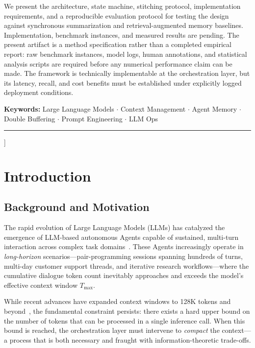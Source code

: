 \documentclass[10pt,twocolumn]{article}
\newcommand{\Tmax}{T_{\max}}
\begin{document}
\begin{center}
{    We present the architecture, state machine, stitching protocol, implementation
    requirements, and a reproducible evaluation protocol for testing the design against
    synchronous summarization and retrieval-augmented memory baselines. Implementation,
    benchmark instances, and measured results are pending. The present
    artifact is a method specification rather than a completed empirical report: raw
    benchmark instances, model logs, human annotations, and statistical analysis scripts
    are required before any numerical performance claim can be made. The framework is
    technically implementable at the orchestration layer, but its latency, recall, and
    cost benefits must be established under explicitly logged deployment conditions.
  }

  \vspace{0.6em}
  {\small\textbf{Keywords:} Large Language Models $\cdot$ Context Management $\cdot$ Agent Memory $\cdot$ Double Buffering $\cdot$ Prompt Engineering $\cdot$ LLM Ops}

  \vspace{0.6em}
  \noindent\rule{0.92\textwidth}{0.4pt}
  \vspace{1.0em}
\end{center}
]


\section{Introduction}\label{sec:intro}

\subsection{Background and Motivation}

The rapid evolution of Large Language Models (LLMs) has catalyzed the emergence of LLM-based autonomous Agents capable of sustained, multi-turn interaction across complex task domains~\cite{wang2024survey, yao2023react}. These Agents increasingly operate in \emph{long-horizon} scenarios---pair-programming sessions spanning hundreds of turns, multi-day customer support threads, and iterative research workflows---where the cumulative dialogue token count inevitably approaches and exceeds the model's effective context window $\Tmax$.

While recent advances have expanded context windows to 128K tokens and beyond~\cite{team2024gemini, chen2023extending}, the fundamental constraint persists: there exists a hard upper bound on the number of tokens that can be processed in a single inference call. When this bound is reached, the orchestration layer must intervene to \emph{compact} the context---a process that is both necessary and fraught with information-theoretic trade-offs.
\end{document}
